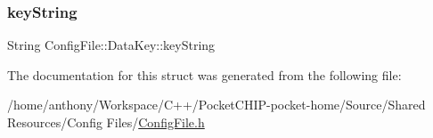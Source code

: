 \subsubsection{\texorpdfstring{key\+String}{keyString}}
{\footnotesize\ttfamily String Config\+File\+::\+Data\+Key\+::key\+String}



The documentation for this struct was generated from the following file\+:\begin{DoxyCompactItemize}
\item 
/home/anthony/\+Workspace/\+C++/\+Pocket\+C\+H\+I\+P-\/pocket-\/home/\+Source/\+Shared Resources/\+Config Files/\mbox{\hyperlink{ConfigFile_8h}{Config\+File.\+h}}\end{DoxyCompactItemize}
